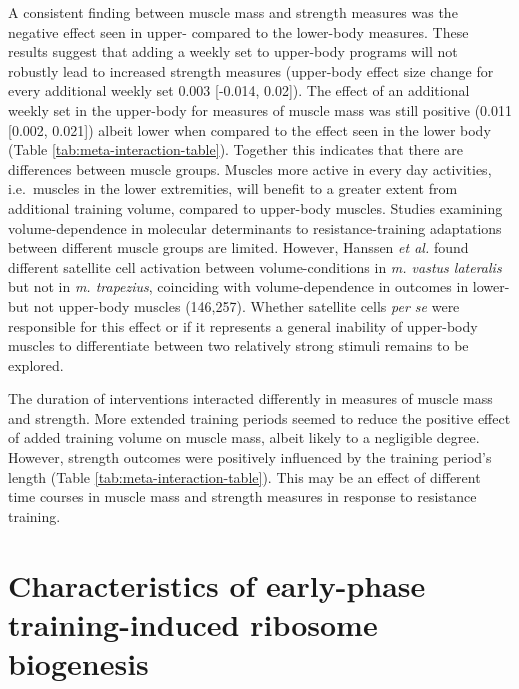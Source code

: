 \documentclass[twoside,10pt]{gihclass} %
\begin{document}
A consistent finding between muscle mass and strength measures was the negative effect seen in upper- compared to the lower-body measures.
These results suggest that adding a weekly set to upper-body programs will not robustly lead to increased strength measures (upper-body effect size change for every additional weekly set 0.003 {[}-0.014, 0.02{]}).
The effect of an additional weekly set in the upper-body for measures of muscle mass was still positive (0.011 {[}0.002, 0.021{]}) albeit lower when compared to the effect seen in the lower body (Table \ref{tab:meta-interaction-table}).
Together this indicates that there are differences between muscle groups. Muscles more active in every day activities, i.e.~muscles in the lower extremities, will benefit to a greater extent from additional training volume, compared to upper-body muscles.
Studies examining volume-dependence in molecular determinants to resistance-training adaptations between different muscle groups are limited.
However, Hanssen \emph{et al.} found different satellite cell activation between volume-conditions in \emph{m. vastus lateralis} but not in \emph{m. trapezius}, coinciding with volume-dependence in outcomes in lower- but not upper-body muscles
(146,257).
Whether satellite cells \emph{per se} were responsible for this effect or if it represents a general inability of upper-body muscles to differentiate between two relatively strong stimuli remains to be explored.

The duration of interventions interacted differently in measures of muscle mass and strength. More extended training periods seemed to reduce the positive effect of added training volume on muscle mass, albeit likely to a negligible degree. However, strength outcomes were positively influenced by the training period's length (Table \ref{tab:meta-interaction-table}). This may be an effect of different time courses in muscle mass and strength measures in response to resistance training.

\hypertarget{characteristics-of-early-phase-training-induced-ribosome-biogenesis}{%
\section{Characteristics of early-phase training-induced ribosome biogenesis}\label{characteristics-of-early-phase-training-induced-ribosome-biogenesis}}
\end{document}
